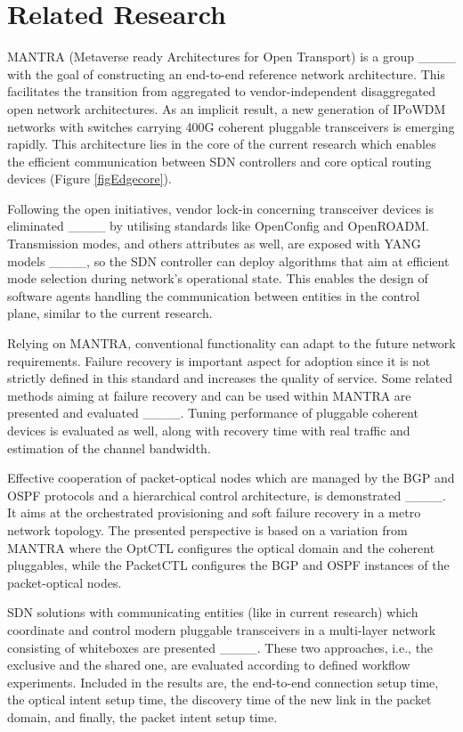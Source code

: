 \section{Related Research\label{lab:related}
}

MANTRA (Metaverse ready Architectures for Open Transport) is a group ____ with the goal of constructing an end-to-end reference network architecture. This facilitates the transition from aggregated to vendor-independent disaggregated open network architectures. As an implicit result, a new generation of IPoWDM networks with switches carrying 400G coherent pluggable transceivers is emerging rapidly. This architecture lies in the core of the current research which enables the efficient communication between SDN controllers and core optical routing devices (Figure \ref{figEdgecore}).

Following the open initiatives, vendor lock-in concerning transceiver devices is eliminated ____ by utilising standards like OpenConfig and OpenROADM. Transmission modes, and others attributes as well, are exposed with YANG models ____, so the SDN controller can deploy algorithms that aim at efficient mode selection during network's operational state. This enables the design of software agents handling the communication between entities in the control plane, similar to the current research.

Relying on MANTRA, conventional functionality can adapt to the future network requirements. Failure recovery is important aspect for adoption since it is not strictly defined in this standard and increases the quality of service. Some related methods aiming at failure recovery and can be used within MANTRA are presented and evaluated ____. Tuning performance of pluggable coherent devices is evaluated as well, along with recovery time with real traffic and estimation of the channel bandwidth.

Effective cooperation of packet-optical nodes which are managed by the BGP and OSPF protocols and a hierarchical control architecture, is demonstrated ____. It aims at the orchestrated provisioning and soft failure recovery in a metro network topology. The presented perspective is based on a variation from MANTRA where the OptCTL configures the optical domain and the coherent pluggables, while the PacketCTL configures the BGP and OSPF instances of the packet-optical nodes.

SDN solutions with communicating entities (like in current research) which coordinate and control modern pluggable transceivers in a multi-layer network consisting of whiteboxes are presented ____. These two approaches, i.e., the exclusive and the shared one, are evaluated according to defined workflow experiments. Included in the results are, the end-to-end connection setup time, the optical intent setup time, the discovery time of the new link in the packet domain, and finally, the packet intent setup time.